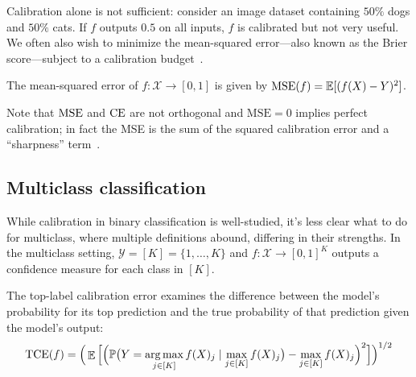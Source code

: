 

Calibration alone is not sufficient: consider an image dataset containing $50\%$ dogs and $50\%$ cats.
If $f$ outputs $0.5$ on all inputs, $f$ is calibrated but not very useful.
We often also wish to minimize the mean-squared error---also known as the Brier score---subject to a calibration budget~\cite{gneiting2005weather, gneiting2007probabilistic}.

\begin{definition}
The mean-squared error of $f : \mathcal{X} \to [0, 1]$ is given by $\textup{MSE}(f) = \mathbb{E}[(f(X) - Y)^2]$.
\end{definition}

Note that $\textup{MSE}$ and $\textup{CE}{}$ are not orthogonal and $\mbox{MSE} = 0$ implies perfect calibration; in fact the MSE is the sum of the squared calibration error and a ``sharpness'' term~\cite{murphy1973vector,degroot1983forecasters, kuleshov2015calibrated}.

\subsection{Multiclass classification}

While calibration in binary classification is well-studied,
it's less clear what to do for multiclass, where multiple definitions abound, differing in their strengths. In the multiclass setting, $\mathcal{Y} = [K] = \{1, \dots, K\}$ and $f : \mathcal{X} \to [0, 1]^K$ outputs a confidence measure for each class in $[K]$.

\begin{definition}
The top-label calibration error examines the difference between the model's probability for its top prediction and the true probability of that prediction given the model's output:
\begin{align}
\textup{TCE}(f) = \Big( \mathop{\mathbb{E}}\Big[ \Big( \mathbb{P}\big(Y = \operatorname*{arg\,max}_{j \in [K]} f(X)_j \mid \max_{j \in [K]} f(X)_j\big) - \max_{j \in [K]} f(X)_j \Big)^2 \Big] \Big)^{1/2}
\end{align}
\end{definition}

